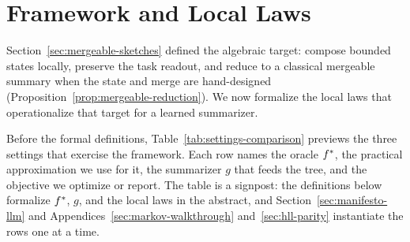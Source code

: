 \section{Framework and Local Laws}\label{sec:framework}

Section~\ref{sec:mergeable-sketches} defined the algebraic target:
compose bounded states locally, preserve the task readout, and reduce to a
classical mergeable summary when the state and merge are hand-designed
(Proposition~\ref{prop:mergeable-reduction}). We now formalize the local
laws that operationalize that target for a learned summarizer.

Before the formal definitions, Table~\ref{tab:settings-comparison} previews the three settings that exercise the framework. Each row names the oracle $f^\ast$, the practical approximation we use for it, the summarizer $g$ that feeds the tree, and the objective we optimize or report. The table is a signpost: the definitions below formalize $f^\ast$, $g$, and the local laws in the abstract, and Section~\ref{sec:manifesto-llm} and Appendices~\ref{sec:markov-walkthrough} and~\ref{sec:hll-parity} instantiate the rows one at a time.

